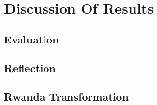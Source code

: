 \chapter{Discussion Of Results}

\section{Evaluation}

\section{Reflection}

\section{Rwanda Transformation}
